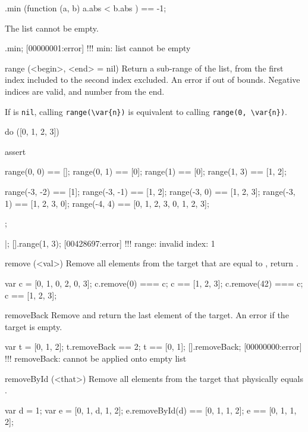 \begin{urbiscriptapi}
\begin{urbiassert}
[2, -1, 3, -4].min (function (a, b) { a.abs < b.abs }) == -1;
\end{urbiassert}

The list cannot be empty.

\begin{urbiscript}
[].min;
[00000001:error] !!! min: list cannot be empty
\end{urbiscript}

\item[range](<begin>, <end> = nil)%
  Return a sub-range of the list, from the first index included to the
  second index excluded.  An error if out of bounds.  Negative indices
  are valid, and number from the end.

  If  is \lstinline|nil|, calling \lstinline|range(\var{n})|
  is equivalent to calling \lstinline|range(0, \var{n})|.

\begin{urbiscript}
do ([0, 1, 2, 3])
{
  assert
  {
    range(0, 0)   == [];
    range(0, 1)   == [0];
    range(1)      == [0];
    range(1, 3)   == [1, 2];

    range(-3, -2) == [1];
    range(-3, -1) == [1, 2];
    range(-3, 0)  == [1, 2, 3];
    range(-3, 1)  == [1, 2, 3, 0];
    range(-4, 4)  == [0, 1, 2, 3, 0, 1, 2, 3];
  };
}|;
[].range(1, 3);
[00428697:error] !!! range: invalid index: 1
\end{urbiscript}

\item[remove](<val>)%
  Remove all elements from the target that are equal to , return
  \this.

\begin{urbiassert}
var c = [0, 1, 0, 2, 0, 3];
c.remove(0) === c;   c ==  [1, 2, 3];
c.remove(42) === c;  c ==  [1, 2, 3];
\end{urbiassert}

\item[removeBack]
  Remove and return the last element of the target. An error if the
  target is empty.

\begin{urbiassert}
var t = [0, 1, 2];
t.removeBack == 2;
t == [0, 1];
[].removeBack;
[00000000:error] !!! removeBack: cannot be applied onto empty list
\end{urbiassert}

\item[removeById](<that>)%
  Remove all elements from the target that physically equals
  .

\begin{urbiassert}
var d = 1;
var e = [0, 1, d, 1, 2];
e.removeById(d) == [0, 1, 1, 2];
e == [0, 1, 1, 2];
\end{urbiassert}


\end{urbiscriptapi}
